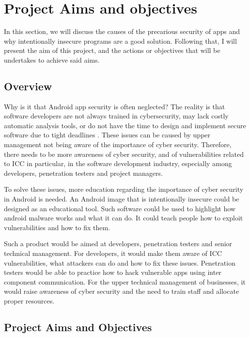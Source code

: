 	\section{Project Aims and objectives}
		\label{sec:intro_objective} 
		
		In this section, we will discuss the causes of the precarious security of apps and why intentionally insecure programs are a good solution. Following that, I will present the aim of this project, and the actions or objectives that will be undertakes to achieve said aims. 
		
		\subsection{Overview}
		
		Why is it that Android app security is often neglected? The reality is that software developers are not always trained in cybersecurity, may lack costly automatic analysis tools, or do not have the time to design and implement secure software due to tight deadlines \cite{malwarebytes_blog}. These issues can be caused by upper management not being aware of the importance of cyber security. Therefore, there needs to be more awareness of cyber security, and of vulnerabilities related to ICC in particular, in the software development industry, especially among developers, penetration testers and project managers.
		
		To solve these issues, more education regarding the importance of cyber security in Android is needed. An Android image that is intentionally insecure could be designed as an educational tool. Such software could be used to highlight how android malware works and what it can do. It could teach people how to exploit vulnerabilities and how to fix them.
		
        Such a product would be aimed at developers, penetration testers and senior technical management. For developers, it would make them aware of ICC vulnerabilities, what attackers can do and how to fix these issues. Penetration testers would be able to practice how to hack vulnerable apps using inter component communication. For the upper technical management of businesses, it would raise awareness of cyber security and the need to train staff and allocate proper resources.
        
        \subsection{Project Aims and Objectives}
        
